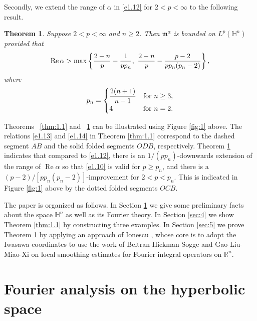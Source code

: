\documentclass[11pt]{amsproc}
\newcommand{\fm}{\mathfrak{m}}
\newcommand{\0}{\mathbf{0}}
\renewcommand{\Re}{\mathop{\mathrm{Re}}}
\renewcommand{\H}{\mathbb{H}}
\numberwithin{equation}{section}
\numberwithin{figure}{section}
\newtheorem{thm}{Theorem}
\theoremstyle{definition}
\theoremstyle{remark}
\numberwithin{thm}{section}
\begin{document}
Secondly, we extend the range of $\alpha$ in \eqref{e1.12} for $2<p< \infty$  to the following result.

\begin{thm}\label{thm:1.2}
Suppose $2< p< \infty$ and $n\geq 2$. Then $\fm^\alpha$ is bounded on $L^p(\H^n)$ provided that
\begin{eqnarray*}
\Re\alpha>\max\left\{{2-n\over p}-{1\over p p_n}, \ {2-n\over p} - {p-2\over p p_n(p_n-2) }\right\},
\end{eqnarray*}
where
\begin{eqnarray}\label{e1.15}
p_n=\begin{cases}
\displaystyle{2(n+1)\over n-1}&\mbox{for }n\geq 3,\\
4&\mbox{for }n=2.
\end{cases}
\end{eqnarray}
\end{thm}

Theorems  ~\ref{thm:1.1}  and  ~\ref{thm:1.2} can be illustrated using Figure \ref{fig:1} above. The relations \eqref{e1.13} and \eqref{e1.14} in Theorem \ref{thm:1.1} correspond to the dashed segment $AB$ and the solid folded segments $ODB$, respectively. Theorem \ref{thm:1.2} indicates that compared to \eqref{e1.12}, there is an $1/(pp_n)$-downwards extension of the range of $\Re\alpha$ so that \eqref{e1.10} is valid for $p\geq p_n$, and there is a $(p-2)/[pp_n(p_n-2)]$-improvement for $2<p<p_n$. This is indicated in Figure \ref{fig:1} above by the dotted folded segments $OCB$.



The paper is organized as follows. In Section \ref{sec:2} we give some preliminary  facts about the space $\H^n$ as well as its Fourier theory. In Section \ref{sec:4} we show Theorem \ref{thm:1.1} by constructing three examples. In  Section \ref{sec:5} we  prove Theorem \ref{thm:1.2} by applying an approach of Ionescu \cite{Io}, whose core is to adopt the Iwasawa coordinates to use the work of Beltran-Hickman-Sogge \cite{BeHiSo} and Gao-Liu-Miao-Xi \cite{GaLiMiXi} on local smoothing estimates for Fourier integral operators on ${\mathbb R^n}$.




\medskip



\section{Fourier analysis on the hyperbolic space}\label{sec:2}
\setcounter{equation}{0}
\end{document}
